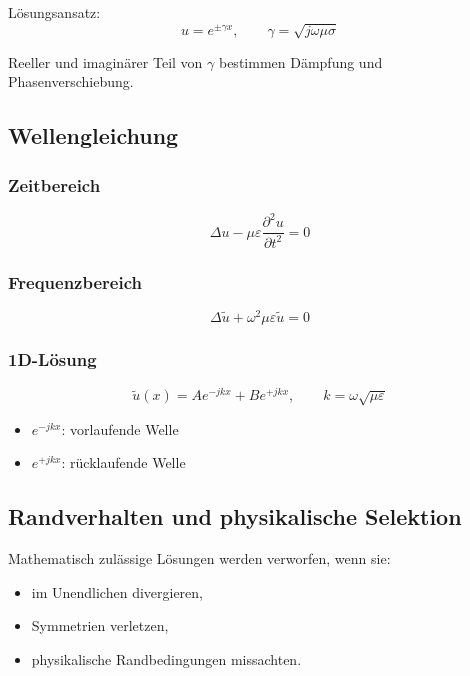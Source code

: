 \documentclass[a4paper]{article}
\newcommand{\eps}{\varepsilon}
\begin{document}
Lösungsansatz:
\[
u = e^{\pm \gamma x},
\qquad
\gamma = \sqrt{j\omega\mu\sigma}
\]

\begin{merke}
Reeller und imaginärer Teil von $\gamma$ bestimmen
Dämpfung und Phasenverschiebung.
\end{merke}

\subsection{Wellengleichung}

\subsubsection{Zeitbereich}

\[
\Delta u - \mu\eps \frac{\partial^2 u}{\partial t^2} = 0
\]

\subsubsection{Frequenzbereich}

\[
\Delta \tilde u + \omega^2 \mu\eps \tilde u = 0
\]

\subsubsection{1D-Lösung}

\[
\tilde u(x)=A e^{-jkx}+B e^{+jkx},
\qquad
k=\omega\sqrt{\mu\eps}
\]

\begin{schema}
\begin{itemize}
  \item $e^{-jkx}$: vorlaufende Welle
  \item $e^{+jkx}$: rücklaufende Welle
\end{itemize}
\end{schema}

\subsection{Randverhalten und physikalische Selektion}

Mathematisch zulässige Lösungen werden verworfen, wenn sie:
\begin{itemize}
  \item im Unendlichen divergieren,
  \item Symmetrien verletzen,
  \item physikalische Randbedingungen missachten.
\end{itemize}
\end{document}
